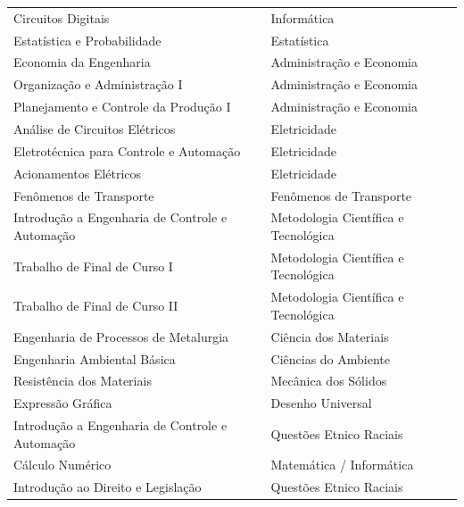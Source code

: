 \documentclass[
	12pt,				%
	openright,			%
	oneside,			%
	a4paper,			%
	english,			%
	brazil				%
	]{abntex2}
\begin{document}
\begin{table}[!h]
{\begin{tabular}{@{}ll@{}}
Circuitos Digitais                                       & Informática                          \\
Estatística e Probabilidade                              & Estatística                          \\
Economia da Engenharia                                   & Administração e Economia             \\
Organização e Administração I                            & Administração e Economia             \\
Planejamento e Controle da Produção I                    & Administração e Economia             \\
Análise de Circuitos Elétricos                           & Eletricidade                         \\
Eletrotécnica para Controle e Automação                  & Eletricidade                         \\
Acionamentos Elétricos                                   & Eletricidade                         \\
Fenômenos de Transporte                                  & Fenômenos de Transporte              \\
Introdução a Engenharia de Controle e Automação          & Metodologia Científica e Tecnológica \\
Trabalho de Final de Curso I                             & Metodologia Científica e Tecnológica \\
Trabalho de Final de Curso II                            & Metodologia Científica e Tecnológica \\
Engenharia de Processos de Metalurgia                    & Ciência dos Materiais                \\
Engenharia Ambiental Básica                              & Ciências do Ambiente                 \\
Resistência dos Materiais                                & Mecânica dos Sólidos                 \\
Expressão Gráfica                                        & Desenho Universal                    \\
Introdução a Engenharia de Controle e Automação          & Questões Etnico Raciais                    \\
Cálculo Numérico                                         & Matemática / Informática             \\
Introdução ao Direito e Legislação                       & Questões Etnico Raciais
\end{tabular}%
}
\end{table}
\end{document}
